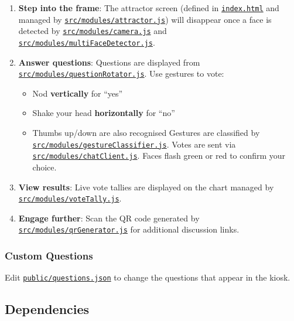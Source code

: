 \begin{enumerate}
\def\labelenumi{\arabic{enumi}.}
\tightlist
\item
  \textbf{Step into the frame}: The attractor screen (defined in
  \href{index.html}{\texttt{index.html}} and managed by
  \href{src/modules/attractor.js}{\texttt{src/modules/attractor.js}})
  will disappear once a face is detected by
  \href{src/modules/camera.js}{\texttt{src/modules/camera.js}} and
  \href{src/modules/multiFaceDetector.js}{\texttt{src/modules/multiFaceDetector.js}}.
\item
  \textbf{Answer questions}: Questions are displayed from
  \href{src/modules/questionRotator.js}{\texttt{src/modules/questionRotator.js}}.
  Use gestures to vote:

  \begin{itemize}
  \tightlist
  \item
    Nod \textbf{vertically} for ``yes''
  \item
    Shake your head \textbf{horizontally} for ``no''
  \item
    Thumbs up/down are also recognised Gestures are classified by
    \href{src/modules/gestureClassifier.js}{\texttt{src/modules/gestureClassifier.js}}.
    Votes are sent via
    \href{src/modules/chatClient.js}{\texttt{src/modules/chatClient.js}}.
    Faces flash green or red to confirm your choice.
  \end{itemize}
\item
  \textbf{View results}: Live vote tallies are displayed on the chart
  managed by
  \href{src/modules/voteTally.js}{\texttt{src/modules/voteTally.js}}.
\item
  \textbf{Engage further}: Scan the QR code generated by
  \href{src/modules/qrGenerator.js}{\texttt{src/modules/qrGenerator.js}}
  for additional discussion links.
\end{enumerate}

\subsubsection{Custom Questions}\label{custom-questions}

Edit \href{public/questions.json}{\texttt{public/questions.json}} to
change the questions that appear in the kiosk.

\subsection{Dependencies}\label{dependencies}

